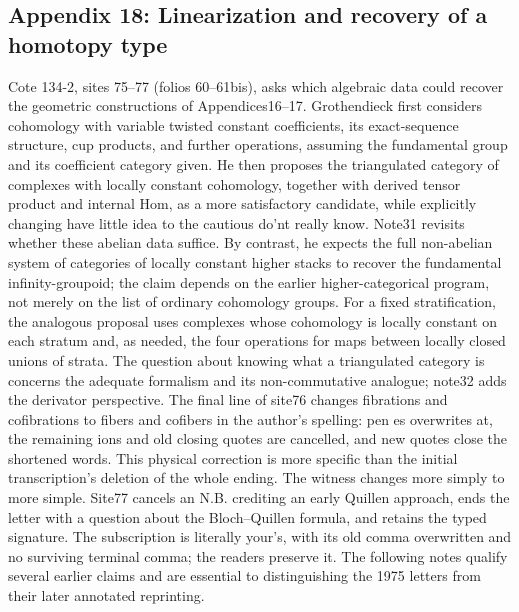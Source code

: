 \documentclass[10pt,oneside]{book}
\begin{document}
\subsection*{Appendix 18: Linearization and recovery of a homotopy type}
Cote 134-2, sites 75--77 (folios 60--61bis), asks which algebraic data could recover the geometric constructions of Appendices16--17. Grothendieck first considers cohomology with variable twisted constant coefficients, its exact-sequence structure, cup products, and further operations, assuming the fundamental group and its coefficient category given. He then proposes the triangulated category of complexes with locally constant cohomology, together with derived tensor product and internal Hom, as a more satisfactory candidate, while explicitly changing have little idea to the cautious do'nt really know. Note31 revisits whether these abelian data suffice. By contrast, he expects the full non-abelian system of categories of locally constant higher stacks to recover the fundamental infinity-groupoid; the claim depends on the earlier higher-categorical program, not merely on the list of ordinary cohomology groups. For a fixed stratification, the analogous proposal uses complexes whose cohomology is locally constant on each stratum and, as needed, the four operations for maps between locally closed unions of strata. The question about knowing what a triangulated category is concerns the adequate formalism and its non-commutative analogue; note32 adds the derivator perspective. The final line of site76 changes fibrations and cofibrations to fibers and cofibers in the author's spelling: pen es overwrites at, the remaining ions and old closing quotes are cancelled, and new quotes close the shortened words. This physical correction is more specific than the initial transcription's deletion of the whole ending. The witness changes more simply to more simple. Site77 cancels an N.B. crediting an early Quillen approach, ends the letter with a question about the Bloch--Quillen formula, and retains the typed signature. The subscription is literally your's, with its old comma overwritten and no surviving terminal comma; the readers preserve it. The following notes qualify several earlier claims and are essential to distinguishing the 1975 letters from their later annotated reprinting.
\end{document}
